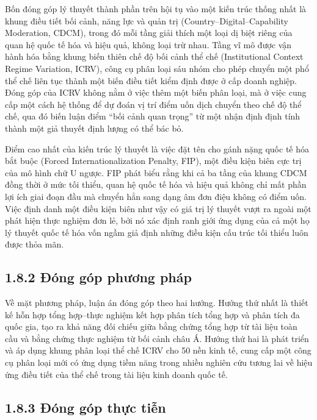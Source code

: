 \documentclass[
  a4paper,
  13pt]{extreport}
\begin{document}
Bốn đóng góp lý thuyết thành phần trên hội tụ vào một kiến trúc thống
nhất là khung điều tiết bối cảnh, năng lực và quản trị
(Country--Digital--Capability Moderation, CDCM), trong đó mỗi tầng giải
thích một loại dị biệt riêng của quan hệ quốc tế hóa và hiệu quả, không
loại trừ nhau. Tầng vĩ mô được vận hành hóa bằng khung biến thiên chế độ
bối cảnh thể chế (Institutional Context Regime Variation, ICRV), công cụ
phân loại sáu nhóm cho phép chuyển một phổ thể chế liên tục thành một
biến điều tiết kiểm định được ở cấp doanh nghiệp. Đóng góp của ICRV
không nằm ở việc thêm một biến phân loại, mà ở việc cung cấp một cách hệ
thống để dự đoán vị trí điểm uốn dịch chuyển theo chế độ thể chế, qua đó
biến luận điểm ``bối cảnh quan trọng'' từ một nhận định định tính thành
một giả thuyết định lượng có thể bác bỏ.

Điểm cao nhất của kiến trúc lý thuyết là việc đặt tên cho gánh nặng quốc
tế hóa bắt buộc (Forced Internationalization Penalty, FIP), một điều
kiện biên cực trị của mô hình chữ U ngược. FIP phát biểu rằng khi cả ba
tầng của khung CDCM đồng thời ở mức tối thiểu, quan hệ quốc tế hóa và
hiệu quả không chỉ mất phần lợi ích giai đoạn đầu mà chuyển hẳn sang
dạng âm đơn điệu không có điểm uốn. Việc định danh một điều kiện biên
như vậy có giá trị lý thuyết vượt ra ngoài một phát hiện thực nghiệm đơn
lẻ, bởi nó xác định ranh giới ứng dụng của cả một họ lý thuyết quốc tế
hóa vốn ngầm giả định những điều kiện cấu trúc tối thiểu luôn được thỏa
mãn.

\hypertarget{ux111uxf3ng-guxf3p-phux1b0ux1a1ng-phuxe1p}{%
\subsection{1.8.2 Đóng góp phương
pháp}\label{ux111uxf3ng-guxf3p-phux1b0ux1a1ng-phuxe1p}}

Về mặt phương pháp, luận án đóng góp theo hai hướng. Hướng thứ nhất là
thiết kế hỗn hợp tổng hợp--thực nghiệm kết hợp phân tích tổng hợp và
phân tích đa quốc gia, tạo ra khả năng đối chiếu giữa bằng chứng tổng
hợp từ tài liệu toàn cầu và bằng chứng thực nghiệm từ bối cảnh châu Á.
Hướng thứ hai là phát triển và áp dụng khung phân loại thể chế ICRV cho
50 nền kinh tế, cung cấp một công cụ phân loại mới có ứng dụng tiềm năng
trong nhiều nghiên cứu tương lai về hiệu ứng điều tiết của thể chế trong
tài liệu kinh doanh quốc tế.

\hypertarget{ux111uxf3ng-guxf3p-thux1ef1c-tiux1ec5n}{%
\subsection{1.8.3 Đóng góp thực
tiễn}\label{ux111uxf3ng-guxf3p-thux1ef1c-tiux1ec5n}}
\end{document}

